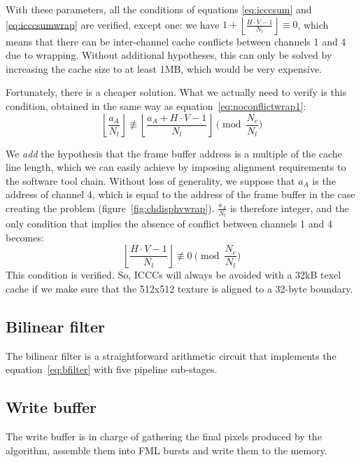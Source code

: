 \documentclass[a4paper,11pt]{kthesis}
\begin{document}
With these parameters, all the conditions of equations \ref{eq:icccsum} and \ref{eq:icccsumwrap} are verified, except one: we have $1 + \left\lfloor \frac{H \cdot V - 1}{N_{l}} \right\rfloor \equiv 0$, which means that there can be inter-channel cache conflicts between channels 1 and 4 due to wrapping. Without additional hypotheses, this can only be solved by increasing the cache size to at least 1MB, which would be very expensive.

Fortunately, there is a cheaper solution. What we actually need to verify is this condition, obtained in the same way as equation~\ref{eq:noconflictwrap1}:
\begin{equation}
\left\lfloor \frac{a_{A}}{N_{l}} \right\rfloor \not \equiv \left\lfloor \frac{a_{A}+H \cdot V-1}{N_{l}} \right\rfloor \pmod{\frac{N_{c}}{N_{l}}}
\end{equation}

We \textit{add} the hypothesis that the frame buffer address is a multiple of the cache line length, which we can easily achieve by imposing alignment requirements to the software tool chain. Without loss of generality, we suppose that $a_{A}$ is the address of channel 4, which is equal to the address of the frame buffer in the case creating the problem (figure~\ref{fig:chdisphvwrap}). $\frac{a_{A}}{N_{l}}$ is therefore integer, and the only condition that implies the absence of conflict between channels 1 and 4 becomes:
\begin{equation}
\left\lfloor \frac{H \cdot V-1}{N_{l}} \right\rfloor \not \equiv 0 \pmod{\frac{N_{c}}{N_{l}}}
\end{equation}
This condition is verified. So, ICCCs will always be avoided with a 32kB texel cache if we make sure that the 512x512 texture is aligned to a 32-byte boundary.

\subsection{Bilinear filter}
The bilinear filter is a straightforward arithmetic circuit that implements the equation~\ref{eq:bfilter} with five pipeline sub-stages.

\subsection{Write buffer}
The write buffer is in charge of gathering the final pixels produced by the algorithm, assemble them into FML bursts and write them to the memory.
\end{document}
